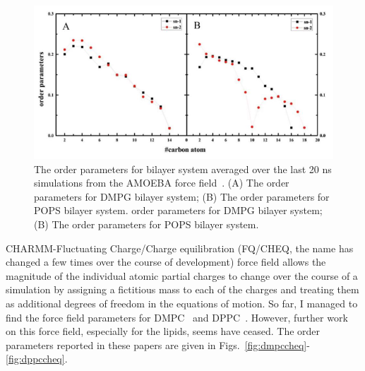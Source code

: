 \documentclass[journal=jpcbfk,manuscript=article,layout=twocolumn]{achemso}
\begin{document}
\begin{figure}[!hbt]
	\centering
	\includegraphics[width=1.05\columnwidth]{../Figures/dmpg_pops_order_parameters_amoeba.png}
	\caption{The order parameters for bilayer system averaged over the last 20 ns simulations from the AMOEBA force field~\cite{chu2018anionicpolarizable}. (A) The
		order parameters for DMPG bilayer system; (B) The order parameters for POPS bilayer system. order parameters for DMPG bilayer system; (B) The order parameters for POPS bilayer system.}
	\label{fig:amoebadmpg}
\end{figure}

CHARMM-Fluctuating Charge/Charge equilibration (FQ/CHEQ, the name has changed a
few times over the course of development) force field allows the magnitude of
the individual atomic partial charges to change over the course of a simulation
by assigning a fictitious mass to each of the charges and treating them as
additional degrees of freedom in the equations of motion. So far, I managed to
find the force field parameters for DMPC~\cite{davis2009molecular} and DPPC~\cite{davis2009charge}. However, further work
on this force field, especially for the lipids, seems have ceased. The order parameters reported in these papers are given in Figs.~\ref{fig:dmpccheq}-\ref{fig:dppccheq}.
\end{document}
